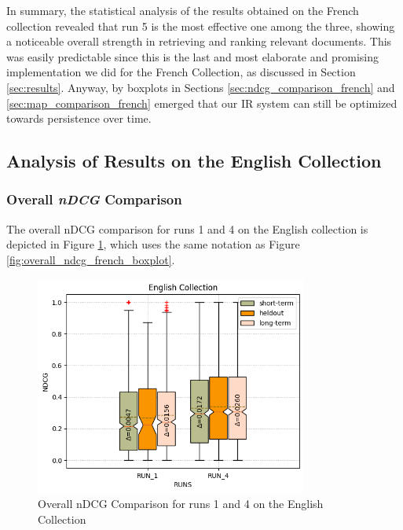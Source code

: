 In summary, the statistical analysis of the results obtained on the French collection revealed that run 5 is the most effective one among the three, showing a noticeable overall strength in retrieving and ranking relevant documents.
This was easily predictable since this is the last and most elaborate and promising implementation we did for the French Collection, as discussed in Section \ref{sec:results}.
Anyway, by boxplots in Sections \ref{sec:ndcg_comparison_french} and \ref{sec:map_comparison_french} emerged that our \ac{IR} system can still be optimized towards persistence over time.


\newpage
\enlargethispage{8\baselineskip}
\subsection{Analysis of Results on the English Collection}

\subsubsection{Overall \textit{nDCG} Comparison} \label{sec:ndcg_comparison_eng}

The overall \ac{nDCG} comparison for runs 1 and 4 on the English collection is depicted in Figure \ref{fig:overall_ndcg_eng}, which uses the same notation as Figure \ref{fig:overall_ndcg_french_boxplot}.

\begin{figure}[!h]
\centering
\includegraphics[width=0.8\textwidth]{figure/StatisticalAnalysis/BoxPlot/NDGC ENGLISH.png}
\caption{Overall nDCG Comparison for runs 1 and 4 on the English Collection}
\label{fig:overall_ndcg_eng}
\end{figure}

